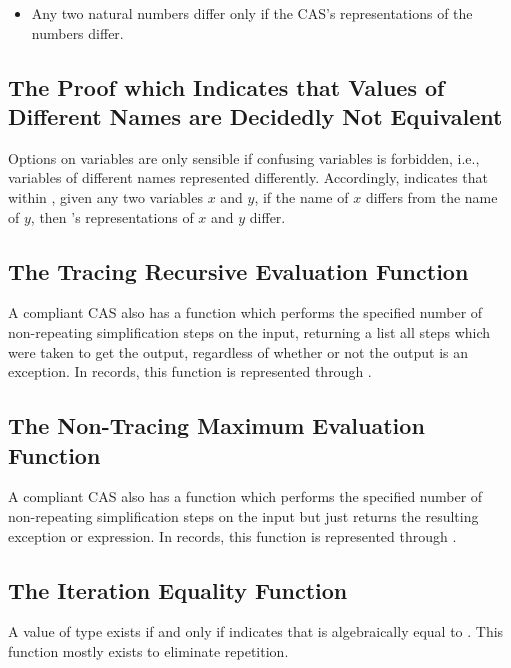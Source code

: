 \documentclass{report}
\begin{document}
\begin{itemize}
  \item Any two natural numbers differ only if the CAS's representations of the numbers differ.
\end{itemize}

\subsection{The Proof which Indicates that Values of Different Names are Decidedly Not Equivalent}
Options on variables are only sensible if confusing variables is forbidden, i.e., variables of different names represented differently.  Accordingly,   indicates that within , given any two variables \(x\) and \(y\), if the name of \(x\) differs from the name of \(y\), then 's representations of \(x\) and \(y\) differ.

\subsection{The Tracing Recursive Evaluation Function}
A compliant CAS also has a function which performs the specified number of non-repeating simplification steps on the input, returning a list all steps which were taken to get the output, regardless of whether or not the output is an exception.  In  records, this function is represented through .

\subsection{The Non-Tracing Maximum Evaluation Function}
A compliant CAS also has a function which performs the specified number of non-repeating simplification steps on the input but just returns the resulting exception or expression.  In  records, this function is represented through .

\subsection{The Iteration Equality Function}
A value of type      exists if and only if      indicates that  is algebraically equal to .  This function mostly exists to eliminate repetition.
\end{document}

